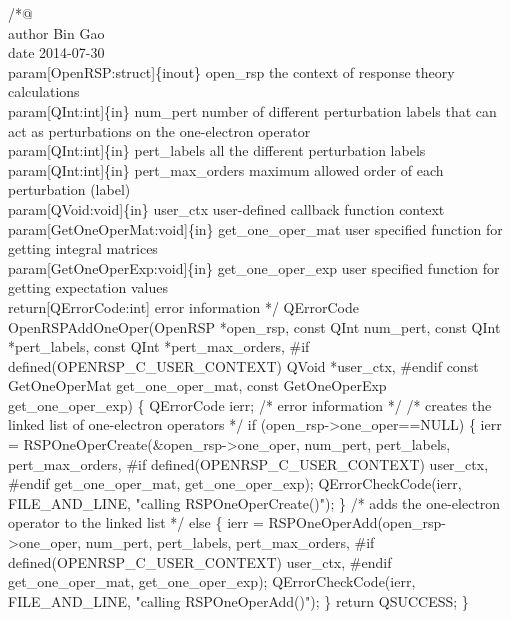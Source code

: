 /*@%
     \\author Bin Gao
     \\date 2014-07-30
     \\param[OpenRSP:struct]\{inout\} open_rsp the context of response theory calculations
     \\param[QInt:int]\{in\} num_pert number of different perturbation labels that can
         act as perturbations on the one-electron operator
     \\param[QInt:int]\{in\} pert_labels all the different perturbation labels
     \\param[QInt:int]\{in\} pert_max_orders maximum allowed order of each perturbation (label)
     \\param[QVoid:void]\{in\} user_ctx user-defined callback function context
     \\param[GetOneOperMat:void]\{in\} get_one_oper_mat user specified function for
         getting integral matrices
     \\param[GetOneOperExp:void]\{in\} get_one_oper_exp user specified function for
         getting expectation values
     \\return[QErrorCode:int] error information
*/
QErrorCode OpenRSPAddOneOper(OpenRSP *open_rsp,
                             const QInt num_pert,
                             const QInt *pert_labels,
                             const QInt *pert_max_orders,
#if defined(OPENRSP_C_USER_CONTEXT)
                             QVoid *user_ctx,
#endif
                             const GetOneOperMat get_one_oper_mat,
                             const GetOneOperExp get_one_oper_exp)
\{
    QErrorCode ierr;  /* error information */
    /* creates the linked list of one-electron operators */
    if (open_rsp->one_oper==NULL) \{
        ierr = RSPOneOperCreate(&open_rsp->one_oper,
                                num_pert,
                                pert_labels,
                                pert_max_orders,
#if defined(OPENRSP_C_USER_CONTEXT)
                                user_ctx,
#endif
                                get_one_oper_mat,
                                get_one_oper_exp);
        QErrorCheckCode(ierr, FILE_AND_LINE, "calling RSPOneOperCreate()");
    \}
    /* adds the one-electron operator to the linked list */
    else \{
        ierr = RSPOneOperAdd(open_rsp->one_oper,
                             num_pert,
                             pert_labels,
                             pert_max_orders,
#if defined(OPENRSP_C_USER_CONTEXT)
                             user_ctx,
#endif
                             get_one_oper_mat,
                             get_one_oper_exp);
        QErrorCheckCode(ierr, FILE_AND_LINE, "calling RSPOneOperAdd()");
    \}
    return QSUCCESS;
\}
\nwendcode{}\nwdocspar


